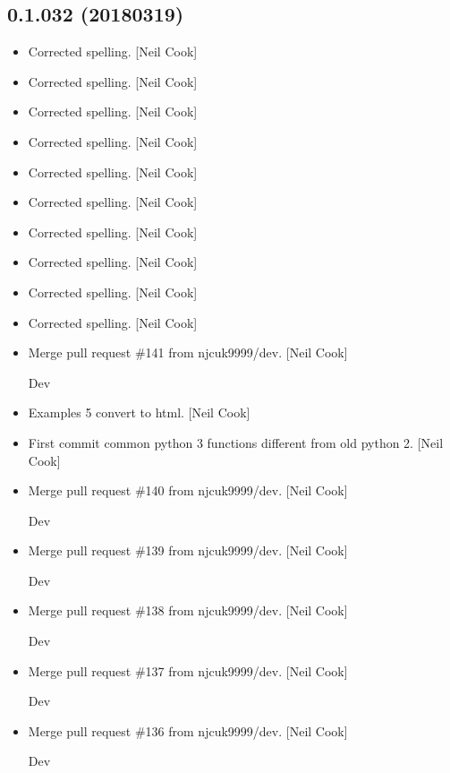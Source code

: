 \documentclass[a4paper,10pt,english]{report}
\begin{document}
\subsection{0.1.032 (2018\sphinxhyphen{}03\sphinxhyphen{}19)}
\label{\detokenize{misc/changelog:id490}}\begin{itemize}
\item {} 
Corrected spelling. {[}Neil Cook{]}

\item {} 
Corrected spelling. {[}Neil Cook{]}

\item {} 
Corrected spelling. {[}Neil Cook{]}

\item {} 
Corrected spelling. {[}Neil Cook{]}

\item {} 
Corrected spelling. {[}Neil Cook{]}

\item {} 
Corrected spelling. {[}Neil Cook{]}

\item {} 
Corrected spelling. {[}Neil Cook{]}

\item {} 
Corrected spelling. {[}Neil Cook{]}

\item {} 
Corrected spelling. {[}Neil Cook{]}

\item {} 
Corrected spelling. {[}Neil Cook{]}

\item {} 
Merge pull request \#141 from njcuk9999/dev. {[}Neil Cook{]}

Dev

\item {} 
Examples 5 convert to html. {[}Neil Cook{]}

\item {} 
First commit \sphinxhyphen{} common python 3 functions different from old python 2.
{[}Neil Cook{]}

\item {} 
Merge pull request \#140 from njcuk9999/dev. {[}Neil Cook{]}

Dev

\item {} 
Merge pull request \#139 from njcuk9999/dev. {[}Neil Cook{]}

Dev

\item {} 
Merge pull request \#138 from njcuk9999/dev. {[}Neil Cook{]}

Dev

\item {} 
Merge pull request \#137 from njcuk9999/dev. {[}Neil Cook{]}

Dev

\item {} 
Merge pull request \#136 from njcuk9999/dev. {[}Neil Cook{]}

Dev

\end{itemize}
\end{document}

